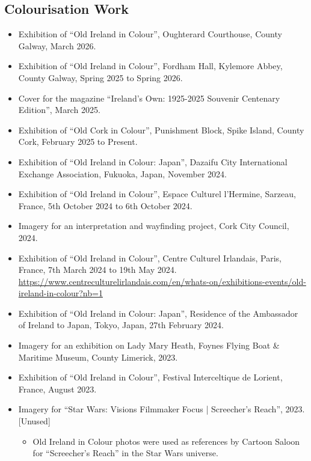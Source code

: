 \documentclass[10pt,a4paper]{res} %
\begin{document}
\begin{resume}
\subsection*{Colourisation Work}

\begin{itemize} \itemsep -2pt
\item Exhibition of ``Old Ireland in Colour'', Oughterard Courthouse, County Galway, March 2026.
\item Exhibition of ``Old Ireland in Colour'', Fordham Hall, Kylemore Abbey, County Galway, Spring 2025 to Spring 2026.
\item Cover for the magazine ``Ireland's Own: 1925-2025 Souvenir Centenary Edition'', March 2025.
\item Exhibition of ``Old Cork in Colour'', Punishment Block, Spike Island, County Cork, February 2025 to Present.
\item Exhibition of ``Old Ireland in Colour: Japan'', Dazaifu City International Exchange Association, Fukuoka, Japan, November 2024.
\item Exhibition of ``Old Ireland in Colour'', Espace Culturel l'Hermine, Sarzeau, France, 5th October 2024 to 6th October 2024.
\item Imagery for an interpretation and wayfinding project, Cork City Council, 2024.
\item Exhibition of ``Old Ireland in Colour'', Centre Culturel Irlandais, Paris, France, 7th March 2024 to 19th May 2024. \url{https://www.centreculturelirlandais.com/en/whats-on/exhibitions-events/old-ireland-in-colour?nb=1}
\item Exhibition of ``Old Ireland in Colour: Japan'', Residence of the Ambassador of Ireland to Japan, Tokyo, Japan, 27th February 2024.
\item Imagery for an exhibition on Lady Mary Heath, Foynes Flying Boat \& Maritime Museum, County Limerick, 2023.
\item Exhibition of ``Old Ireland in Colour'', Festival Interceltique de Lorient, France, August 2023.
\item Imagery for ``Star Wars: Visions Filmmaker Focus | Screecher's Reach'', 2023. [Unused]
\begin{itemize} \itemsep -2pt
\item Old Ireland in Colour photos were used as references by Cartoon Saloon for ``Screecher's Reach'' in the Star Wars universe.
\end{itemize}

\end{itemize}
\end{resume}
\end{document}
